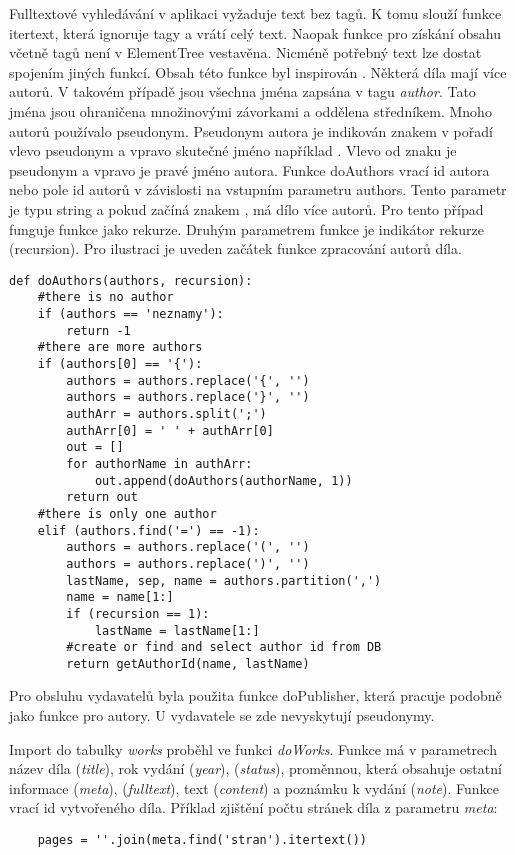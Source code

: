             Fulltextové vyhledávání v aplikaci vyžaduje text bez tagů. K tomu slouží funkce itertext, která ignoruje tagy a vrátí celý text. Naopak funkce pro získání obsahu včetně tagů není v ElementTree vestavěna. Nicméně potřebný text lze dostat spojením jiných funkcí. Obsah této funkce byl inspirován \cite{fn01}. 
            Některá díla mají více autorů. V takovém případě jsou všechna jména zapsána v tagu \textit{author}. Tato jména jsou ohraničena množinovými závorkami a oddělena středníkem. Mnoho autorů používalo pseudonym. Pseudonym autora je indikován znakem \uv{=} v pořadí vlevo pseudonym a vpravo skutečné jméno například . Vlevo od znaku je pseudonym a vpravo je pravé jméno autora. Funkce doAuthors vrací id autora nebo pole id autorů v závislosti na vstupním parametru authors. Tento parametr je typu string a pokud začíná znakem \uv{\{}, má dílo více autorů. Pro tento případ funguje funkce jako rekurze. Druhým parametrem funkce je indikátor rekurze (recursion).
            Pro ilustraci je uveden začátek funkce zpracování autorů díla.
             \begin{verbatim}
def doAuthors(authors, recursion):
    #there is no author
    if (authors == 'neznamy'):
        return -1
    #there are more authors
    if (authors[0] == '{'):
        authors = authors.replace('{', '')
        authors = authors.replace('}', '')
        authArr = authors.split(';')
        authArr[0] = ' ' + authArr[0]
        out = []
        for authorName in authArr:
            out.append(doAuthors(authorName, 1))
        return out
    #there is only one author 
    elif (authors.find('=') == -1):
        authors = authors.replace('(', '')
        authors = authors.replace(')', '')
        lastName, sep, name = authors.partition(',')
        name = name[1:]
        if (recursion == 1):
            lastName = lastName[1:]
        #create or find and select author id from DB    
        return getAuthorId(name, lastName)
             \end{verbatim}
            
            Pro obsluhu vydavatelů byla použita funkce doPublisher, která pracuje podobně jako funkce pro autory. U vydavatele se zde nevyskytují pseudonymy. 
            
            Import do tabulky \textit{works} proběhl ve funkci \textit{doWorks}. Funkce má v parametrech název díla (\textit{title}), rok vydání (\textit{year}), (\textit{status}), proměnnou, která obsahuje ostatní informace (\textit{meta}), (\textit{fulltext}), text (\textit{content}) a poznámku k vydání (\textit{note}). Funkce vrací id vytvořeného díla. Příklad zjištění počtu stránek díla z parametru \textit{meta}:
            \begin{lstlisting}
    pages = ''.join(meta.find('stran').itertext())
            \end{lstlisting}
            
